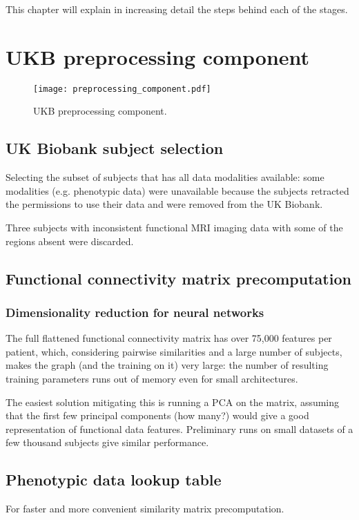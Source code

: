 This chapter will explain in increasing detail the steps behind each of the stages.

\section{UKB preprocessing component}
\begin{figure}[h]
    \centering
    \texttt{[image: preprocessing\_component.pdf]}
    \caption{UKB preprocessing component.}\label{preprocessing-component}
\end{figure}

\subsection{UK Biobank subject selection}
Selecting the subset of subjects that has all data modalities available: some modalities (e.g. phenotypic data) were unavailable because the subjects retracted the permissions to use their data and were removed from the UK Biobank.

Three subjects with inconsistent functional MRI imaging data with some of the regions absent were discarded.


\subsection{Functional connectivity matrix precomputation}

\subsubsection{Dimensionality reduction for neural networks}
The full flattened functional connectivity matrix has over 75,000 features per patient, which, considering pairwise similarities and a large number of subjects, makes the graph (and the training on it) very large: the number of resulting training parameters runs out of memory even for small architectures.

The easiest solution mitigating this is running a PCA on the matrix, assuming that the first few principal components (how many?) would give a good representation of functional data features. Preliminary runs on small datasets of a few thousand subjects give similar performance.

\subsection{Phenotypic data lookup table}
For faster and more convenient similarity matrix precomputation.

